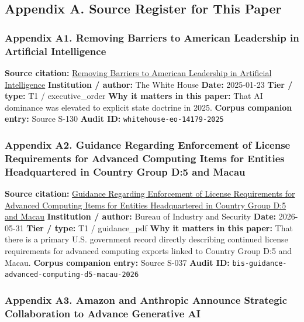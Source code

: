 \documentclass[
  american,
  11pt,
  letterpaper,
]{article}
\begin{document}
\subsection{Appendix A. Source Register for This
Paper}\label{appendix-a.-source-register-for-this-paper-7}

\subsubsection{Appendix A1. Removing Barriers to American Leadership in
Artificial
Intelligence}\label{ch-07-appendix-a1-removing-barriers-to-american-leadership-in-artificial-intelligence}

\textbf{Source citation:}
\href{https://www.whitehouse.gov/presidential-actions/2025/01/removing-barriers-to-american-leadership-in-artificial-intelligence/}{Removing
Barriers to American Leadership in Artificial Intelligence}
\textbf{Institution / author:} The White House \textbf{Date:} 2025-01-23
\textbf{Tier / type:} T1 / executive\_order \textbf{Why it matters in
this paper:} That AI dominance was elevated to explicit state doctrine
in 2025. \textbf{Corpus companion entry:} Source S-130 \textbf{Audit
ID:} \texttt{whitehouse-eo-14179-2025}

\subsubsection{Appendix A2. Guidance Regarding Enforcement of License
Requirements for Advanced Computing Items for Entities Headquartered in
Country Group D:5 and
Macau}\label{ch-07-appendix-a2-guidance-regarding-enforcement-of-license-requirements-for-advanced-computing-items-for-entities-headquartered-in-country-group-d-5-and-macau}

\textbf{Source citation:}
\href{https://www.bis.gov/media/documents/bis-guidance-may-31-2026.pdf}{Guidance
Regarding Enforcement of License Requirements for Advanced Computing
Items for Entities Headquartered in Country Group D:5 and Macau}
\textbf{Institution / author:} Bureau of Industry and Security
\textbf{Date:} 2026-05-31 \textbf{Tier / type:} T1 / guidance\_pdf
\textbf{Why it matters in this paper:} That there is a primary U.S.
government record directly describing continued license requirements for
advanced computing exports linked to Country Group D:5 and Macau.
\textbf{Corpus companion entry:} Source S-037 \textbf{Audit ID:}
\texttt{bis-guidance-advanced-computing-d5-macau-2026}

\subsubsection{Appendix A3. Amazon and Anthropic Announce Strategic
Collaboration to Advance Generative
AI}\label{ch-07-appendix-a3-amazon-and-anthropic-announce-strategic-collaboration-to-advance-generative-ai}
\end{document}
